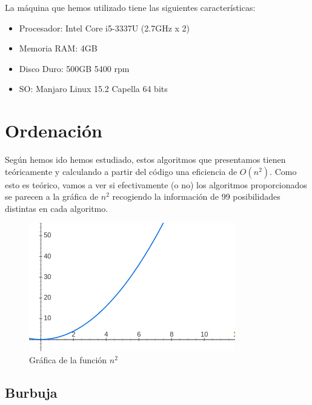 La máquina que hemos utilizado tiene las siguientes características:
	
\begin{itemize}
		
	\item Procesador: Intel Core i5-3337U (2.7GHz x 2)
	\item Memoria RAM: 4GB
	\item Disco Duro: 500GB 5400 rpm
	\item SO: Manjaro Linux 15.2 Capella 64 bits
\end{itemize}
	



\section{Ordenación} %


Según hemos ido hemos estudiado, estos algoritmos que presentamos tienen teóricamente y calculando a partir del código una eficiencia de $O(n^2 )$. Como esto es teórico, vamos a ver si efectivamente (o no) los algoritmos proporcionados se parecen a la gráfica de $n^2$ recogiendo la información de 99 posibilidades distintas en cada algoritmo.
\begin{figure}[H]
	\centering
	\includegraphics[scale=0.5]{imagenes/enecuadrado.png}
	\caption{Gráfica de la función $n^2$}
	\label{fig:E1}
\end{figure}



\subsection{Burbuja}


